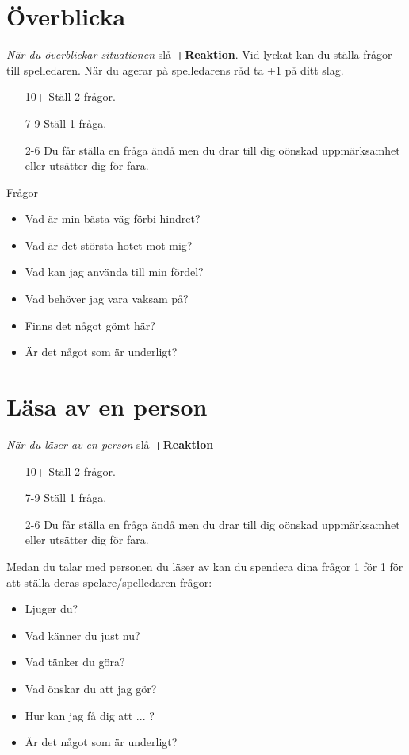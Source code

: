 \section{Överblicka}
\textit{När du överblickar situationen} slå \textbf{+Reaktion}. Vid lyckat kan du ställa frågor till spelledaren. När du agerar på spelledarens råd ta +1 på ditt slag.
\begin{itemize}
  \item[10+] Ställ 2 frågor.
  \item[7-9] Ställ 1 fråga.
  \item[2-6] Du får ställa en fråga ändå men du drar till dig oönskad uppmärksamhet eller utsätter dig för fara.
\end{itemize}
Frågor
\begin{itemize}
  \item Vad är min bästa väg förbi hindret?
  \item Vad är det största hotet mot mig?
  \item Vad kan jag använda till min fördel?
  \item Vad behöver jag vara vaksam på?
  \item Finns det något gömt här?
  \item Är det något som är underligt?
\end{itemize}
\section{Läsa av en person}
\textit{När du läser av en person} slå \textbf{+Reaktion}
\begin{itemize}
  \item[10+] Ställ 2 frågor.
  \item[7-9] Ställ 1 fråga.
  \item[2-6] Du får ställa en fråga ändå men du drar till dig oönskad uppmärksamhet eller utsätter dig för fara.
\end{itemize}
Medan du talar med personen du läser av kan du spendera dina frågor 1 för 1 för att ställa deras spelare/spelledaren frågor:
\begin{itemize}
  \item Ljuger du?
  \item Vad känner du just nu?
  \item Vad tänker du göra?
  \item Vad önskar du att jag gör?
  \item Hur kan jag få dig att ... ?
  \item Är det något som är underligt?
\end{itemize}
